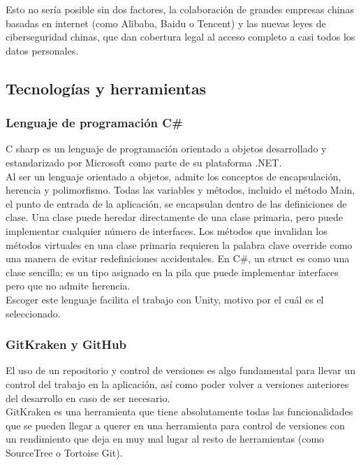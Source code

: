 \quad Esto no sería posible sin dos factores, la colaboración de grandes empresas chinas basadas en internet (como Alibaba, Baidu o Tencent) y las nuevas leyes de ciberseguridad chinas, que dan cobertura legal al acceso completo a casi todos los datos personales.\\

\subsection{Tecnologías y herramientas}

	\subsubsection{Lenguaje de programación C\#}

\quad C sharp \cite{CSharp} es un lenguaje de programación orientado a objetos desarrollado y estandarizado por Microsoft como parte de su plataforma .NET.\\

\quad Al ser un lenguaje orientado a objetos, admite los conceptos de encapsulación, herencia y polimorfismo. Todas las variables y métodos, incluido el método Main, el punto de entrada de la aplicación, se encapsulan dentro de las definiciones de clase. Una clase puede heredar directamente de una clase primaria, pero puede implementar cualquier número de interfaces. Los métodos que invalidan los métodos virtuales en una clase primaria requieren la palabra clave override como una manera de evitar redefiniciones accidentales. En C\#, un struct es como una clase sencilla; es un tipo asignado en la pila que puede implementar interfaces pero que no admite herencia.\\

\quad Escoger este lenguaje facilita el trabajo con Unity, motivo por el cuál es el seleccionado.\\
	
	\subsubsection{GitKraken y GitHub}
	
\quad El uso de un repositorio y control de versiones es algo fundamental para llevar un control del trabajo en la aplicación, así como poder volver a versiones anteriores del desarrollo en caso de ser necesario.\\

\quad GitKraken \cite{GitKraken} es una herramienta que tiene absolutamente todas las funcionalidades que se pueden llegar a querer en una herramienta para control de versiones con un rendimiento que deja en muy mal lugar al resto de herramientas (como SourceTree o Tortoise Git).\\

